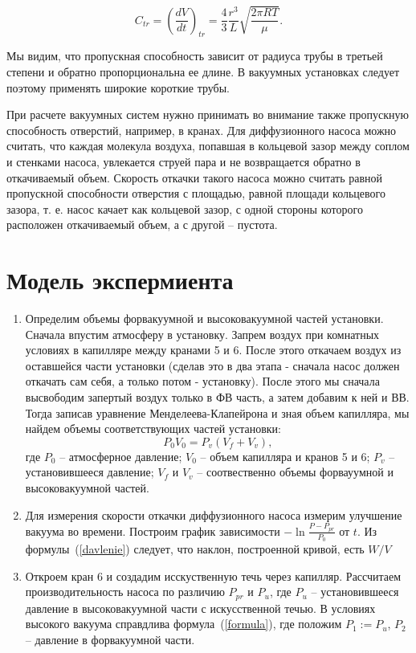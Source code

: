 \documentclass[a4paper, 12pt]{article}%
\begin{document}
\begin{equation}
	C_{tr}=(\frac{dV}{dt})_{tr}=\frac{4}{3}\frac{r^3}{L}\sqrt{\frac{2\pi RT}{\mu}}.
\end{equation}

	Мы видим, что пропускная способность зависит от радиуса трубы в третьей степени и обратно пропорциональна ее длине. В вакуумных установках следует поэтому применять широкие короткие  трубы.
	
	При расчете вакуумных систем нужно принимать во внимание также пропускную способность отверстий, например, в кранах. Для диффузионного насоса можно считать, что каждая молекула воздуха, попавшая в кольцевой зазор между соплом и стенками насоса, увлекается струей пара и не возвращается обратно в откачиваемый объем. Скорость откачки такого насоса можно считать равной пропускной способности отверстия с площадью, равной площади кольцевого зазора, т. е. насос качает как кольцевой зазор, с одной стороны которого расположен откачиваемый объем, а с другой -- пустота.
\section{Модель экспермиента}
\begin{enumerate}
\item
	Определим объемы форвакуумной и высоковакуумной частей установки. Сначала впустим атмосферу в установку. Запрем воздух при комнатных условиях в капилляре между кранами 5 и 6. После этого откачаем воздух из оставшейся части установки (сделав это в два этапа - сначала насос должен откачать сам себя, а только потом - установку). После этого мы сначала высвободим запертый воздух только в ФВ часть, а затем добавим к ней и ВВ. Тогда записав уравнение Менделеева-Клапейрона и зная объем капилляра, мы найдем объемы соответствующих частей установки:
\begin{equation}
	P_0 V_0 = P_v (V_f + V_v),
\end{equation}
где $P_0$ -- атмосферное давление; $V_0$ -- объем капилляра и кранов 5 и 6; $P_v$ -- установившееся давление; $V_f$ и $V_v$ -- соотвественно объемы форвауумной и высоковакуумной частей.
	
\item
	Для измерения скорости откачки диффузионного насоса измерим улучшение вакуума во времени. Построим график зависимости $-\ln{\frac{P-P_{pr}}{P_0}}$ от $t$. Из формулы~(\ref{davlenie}) следует, что наклон, построенной кривой, есть $W / V$

\item
	Откроем кран 6 и создадим исскуственную течь через капилляр. Рассчитаем производительность насоса по различию $P_{pr}$ и $P_u$, где $P_u$ -- установившееся давление в высоковакуумной части с искусственной течью. В условиях высокого вакуума справдлива формула~(\ref{formula}), где положим $P_1 := P_u$, $P_2$ -- давление в форвакуумной части. 


\end{enumerate}
\end{document}
